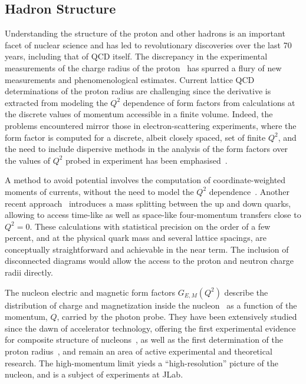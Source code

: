
\subsection{Hadron Structure}

Understanding the structure of the proton and other hadrons is an important facet of  nuclear science and  has led to revolutionary discoveries over the last 70 years, including that of QCD itself.  
The discrepancy in the experimental measurements of the charge radius of the proton~\cite{Antognini:1900ns} has spurred a flury of new measurements and phenomenological estimates. Current lattice QCD determinations of the proton radius are challenging since the derivative is extracted from modeling the $Q^2$ dependence of form factors from calculations at the discrete values of momentum accessible in a finite volume.  Indeed, the problems encountered mirror those in electron-scattering experiments, where the form factor is computed for a discrete, albeit closely spaced, set of finite $Q^2$, and the need to include dispersive methods in the analysis of the form factors over the values of $Q^2$ probed in experiment has been emphasised~\cite{Alarcon:2018irp}.

A method to avoid potential involves the computation of coordinate-weighted moments of currents, without the need to model the $Q^2$ dependence~\cite{Bouchard:2016gmc}. Another recent approach~\cite{1812.00313} introduces a mass splitting between the up and down quarks, allowing to access time-like as well as space-like four-momentum transfers close to $Q^2=0$. These calculations with statistical precision on the order of a few percent, and at the physical quark mass and several lattice spacings, are conceptually straightforward and achievable in the near term. The inclusion of disconnected diagrams would allow the access to the proton and neutron charge radii directly.

The nucleon electric and magnetic form factors $G_{E,M}(Q^2)$ describe the distribution of charge and
magnetization inside the
nucleon~\cite{Burkardt:2000za,Burkardt:2002hr,Miller:2007uy,Carlson:2007xd} as a function of the momentum, $Q$, carried by the photon probe.
They have been extensively studied since the dawn of
accelerator technology, offering the first experimental evidence for composite structure 
of nucleons~\cite{Hofstadter:1955ae}, as well as the first
determination of the proton radius~\cite{Chambers:1956zz},
and remain an area of active experimental and theoretical research. The high-momentum limit yieds a ``high-resolution'' picture of the nucleon, and is a subject of experiments at JLab.


